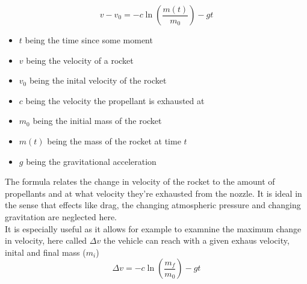 \documentclass[../formulas.tex]{subfiles}
\begin{document}
\begin{equation}
	v-v_0= -c\ln\left ( \frac{m(t)}{m_0}\right ) - gt
\end{equation}
\begin{itemize}
	\item $t$ being the time since some moment
	\item $v$ being the velocity of a rocket
	\item $v_0$ being the inital velocity of the rocket
	\item $c$ being the velocity the propellant is exhausted at
	\item $m_0$ being the initial mass of the rocket
	\item $m(t)$ being the mass of the rocket at time $t$
	\item $g$ being the gravitational acceleration
\end{itemize}
The formula relates the change in velocity of the rocket to the amount of propellants and at
what velocity they're exhausted from the nozzle.
It is ideal in the sense that effects like drag, the changing atmospheric pressure and changing
gravitation are neglected here.\\
It is especially useful as it allows for example to examnine the maximum change in velocity,
here called $\Delta v$ the vehicle can reach with a given exhaus velocity, inital and
final mass ($m_i$)
\begin{displaymath}
	\Delta v = -c\ln\left ( \frac{m_f}{m_0}\right ) - gt
\end{displaymath}
\end{document}
